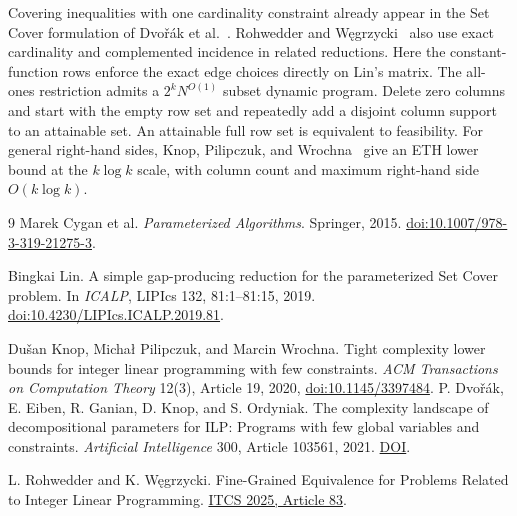 \documentclass[11pt]{article}
\begin{document}
Covering inequalities with one cardinality constraint already appear
in the Set Cover formulation of Dvo\v{r}\'ak et al.~\cite[Theorem~25]{degko}.
Rohwedder and W\k{e}grzycki~\cite[Lemmas~15--16]{rw} also use exact
cardinality and complemented incidence in related reductions.
Here the constant-function rows enforce the exact edge choices
directly on Lin's matrix. The all-ones restriction admits a
\(2^kN^{O(1)}\) subset dynamic program. Delete zero columns and
start with the empty row set and repeatedly add a disjoint column
support to an attainable set. An attainable full row set is equivalent to feasibility.
For general right-hand sides, Knop, Pilipczuk, and
Wrochna~\cite[Theorem~1, p.~19:4]{kpw} give an ETH lower bound at the
\(k\log k\) scale, with column count and maximum right-hand side
\(O(k\log k)\).

\begin{thebibliography}{9}
Marek Cygan et al.
\newblock \emph{Parameterized Algorithms}.
\newblock Springer, 2015.
\newblock \href{https://doi.org/10.1007/978-3-319-21275-3}{doi:10.1007/978-3-319-21275-3}.

Bingkai Lin.
\newblock A simple gap-producing reduction for the parameterized Set Cover problem.
\newblock In \emph{ICALP}, LIPIcs 132, 81:1--81:15, 2019.
\newblock \href{https://doi.org/10.4230/LIPIcs.ICALP.2019.81}{doi:10.4230/LIPIcs.ICALP.2019.81}.

Du\v{s}an Knop, Micha{\l} Pilipczuk, and Marcin Wrochna.
\newblock Tight complexity lower bounds for integer linear programming with few constraints.
\newblock \emph{ACM Transactions on Computation Theory} 12(3), Article 19,
2020, \href{https://doi.org/10.1145/3397484}{doi:10.1145/3397484}.
P. Dvo\v{r}\'ak, E. Eiben, R. Ganian, D. Knop, and S. Ordyniak.
The complexity landscape of decompositional parameters for ILP:
Programs with few global variables and constraints.
\emph{Artificial Intelligence} 300, Article 103561, 2021.
\href{https://doi.org/10.1016/j.artint.2021.103561}{DOI}.

L. Rohwedder and K. W\k{e}grzycki.
Fine-Grained Equivalence for Problems Related to Integer Linear Programming.
\href{https://doi.org/10.4230/LIPIcs.ITCS.2025.83}{ITCS 2025, Article 83}.

\end{thebibliography}
\end{document}
